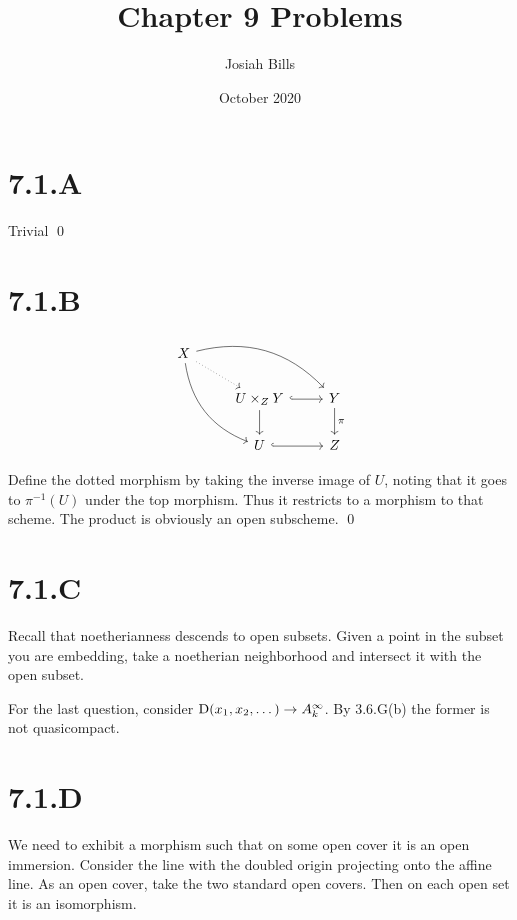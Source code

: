 \documentclass{article}
\title{Chapter 9 Problems}
\author{Josiah Bills}
\date{October 2020}
\begin{document}
\maketitle

\section{7.1.A}
Trivial \qed

\section{7.1.B}
\[
    \begin{tikzcd}
        X \ar[drr, bend left] \ar[ddr, bend right] \ar[dr, dotted] &
                                                                   &
        \\
                                                                   & U \times_Z
        Y \ar[d] \ar[r, hook]                                      & Y \ar[d,
            "\pi"]
        \\
                                                                   & U \ar[r,
        hook]                                                      & Z
    \end{tikzcd}
\]

Define the dotted morphism by taking the inverse image of
$U$, noting that it goes to $\pi^{-1}(U)$ under
the top morphism. Thus it restricts to a morphism to that scheme. The product
is obviously an open subscheme. \qed

\section{7.1.C}
Recall that noetherianness descends to open subsets. Given a point in the
subset you are embedding, take a noetherian neighborhood and intersect it with
the open subset.

For the last question, consider $\operatorname{D}(x_1, x_2, \dots) \to A^{\infty}_k$. By 3.6.G(b) the former
is not quasicompact.

\section{7.1.D}
We need to exhibit a morphism such that on some open cover it is an open
immersion. Consider the line with the doubled origin projecting onto the affine
line. As an open cover, take the two standard open covers. Then on each open
set it is an isomorphism.
\end{document}
